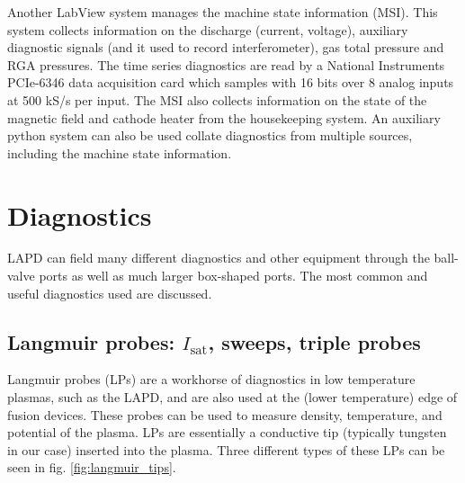 Another LabView system manages the machine state information (MSI). This system collects information on the discharge (current, voltage), auxiliary diagnostic signals (and it used to record interferometer), gas total pressure and RGA pressures. The time series diagnostics are read by a National Instruments PCIe-6346 data acquisition card which samples with 16 bits over 8 analog inputs at 500 kS/s per input. The MSI also collects information on the state of the magnetic field and cathode heater from the housekeeping system. An auxiliary python system can also be used collate diagnostics from multiple sources, including the machine state information.

\section{Diagnostics}

LAPD can field many different diagnostics and other equipment through the ball-valve ports as well as much larger box-shaped ports. The most common and useful diagnostics used are discussed.

\subsection{Langmuir probes: $I_\text{sat}$, sweeps, triple probes}

Langmuir probes (LPs) are a workhorse of diagnostics in low temperature plasmas, such as the LAPD, and are also used at the (lower temperature) edge of fusion devices. These probes can be used to measure density, temperature, and potential of the plasma. LPs are essentially a conductive tip (typically tungsten in our case) inserted into the plasma. Three different types of these LPs can be seen in fig. \ref{fig:langmuir_tips}. 

